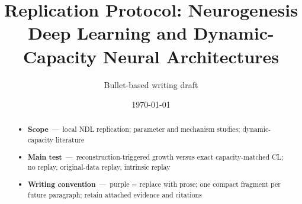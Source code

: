\documentclass[11pt,a4paper]{article}
\title{Replication Protocol: Neurogenesis Deep Learning and Dynamic-Capacity Neural Architectures}
\author{Bullet-based writing draft}
\date{\today}
\newenvironment{draftpoints}
  {\begin{itemize}[leftmargin=*,topsep=0.35em,itemsep=0.32em,parsep=0.1em]\color{ProtocolPurple}}
  {\end{itemize}}
\newcommand{\draftkey}[1]{\textbf{#1}~---~}
\begin{document}
\maketitle

\begin{abstract}
\begin{draftpoints}
  \item \draftkey{Scope}local NDL replication; parameter and mechanism studies; dynamic-capacity literature
  \item \draftkey{Main test}reconstruction-triggered growth versus exact capacity-matched CL; no replay, original-data replay, intrinsic replay
  \item \draftkey{Writing convention}purple = replace with prose; one compact fragment per future paragraph; retain attached evidence and citations
\end{draftpoints}
\end{abstract}

\tableofcontents
\clearpage














\appendix




\end{document}
